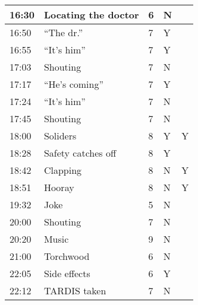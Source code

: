 \begin{longtable}{| p{70pt} | p{130pt} | p{45pt} | p{57pt} | p{60pt}|}
16:30           &           Locating the doctor           &           6           &           N          &           \\\hline
16:50           &           ``The dr.''           &           7           &           Y          &           \\\hline
16:55           &           ``It's him''           &           7           &           Y          &           \\\hline
17:03           &           Shouting           &           7           &           N          &           \\\hline
17:17           &           ``He's coming''           &           7           &           Y          &           \\\hline
17:24           &           ``It's him''           &           7           &           N          &           \\\hline
17:45           &           Shouting           &           7           &           N          &           \\\hline
18:00           &           Soliders           &           8           &           Y          &Y           \\\hline
18:28           &           Safety catches off           &           8           &           Y          &           \\\hline
18:42           &           Clapping           &           8           &           N          & Y          \\\hline
18:51           &           Hooray           &           8           &           N          &Y           \\\hline
19:32           &           Joke           &           5           &           N          &           \\\hline
20:00           &           Shouting           &           7           &           N          &           \\\hline
20:20           &           Music           &           9           &           N          &           \\\hline
21:00           &           Torchwood           &           6           &           N          &           \\\hline
22:05           &           Side effects           &           6           &           Y          &           \\\hline
22:12           &           TARDIS taken           &           7           &           N          &           \\\hline

\end{longtable}
